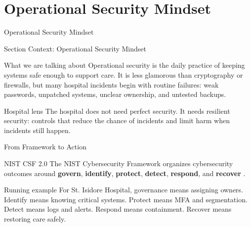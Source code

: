 \documentclass[presentation]{beamer}
\newcommand{\sectiontitleframe}[1]{
\begin{frame}[plain,c]
\begin{center}
{\usebeamerfont{title}\usebeamercolor[fg]{title}#1}
\end{center}
\end{frame}
}
\newcommand{\scenario}{St. Isidore Hospital}
\begin{document}
\section{Operational Security Mindset}
\sectiontitleframe{Operational Security Mindset}

\begin{frame}[c]{Section Context: Operational Security Mindset}
\begin{block}{What we are talking about}
Operational security is the daily practice of keeping systems safe enough to support care. It is
less glamorous than cryptography or firewalls, but many hospital incidents begin with routine
failures: weak passwords, unpatched systems, unclear ownership, and untested backups.
\end{block}

\begin{exampleblock}{Hospital lens}
The hospital does not need perfect security. It needs resilient security: controls that reduce the
chance of incidents and limit harm when incidents still happen.
\end{exampleblock}
\end{frame}

\begin{frame}[c]{From Framework to Action}
\begin{block}{NIST CSF 2.0}
The NIST Cybersecurity Framework organizes cybersecurity outcomes around \textbf{govern},
\textbf{identify}, \textbf{protect}, \textbf{detect}, \textbf{respond}, and \textbf{recover}
\cite{nist_csf}.
\end{block}

\begin{exampleblock}{Running example}
For \scenario{}, governance means assigning owners. Identify means knowing critical systems. Protect
means MFA and segmentation. Detect means logs and alerts. Respond means containment. Recover means
restoring care safely.
\end{exampleblock}
\end{frame}
\end{document}
